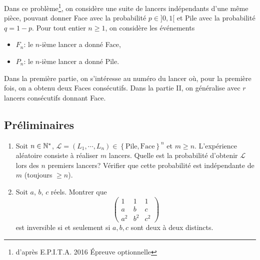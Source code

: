 Dans ce problème\footnote{d'après E.P.I.T.A. 2016 \'Epreuve optionnelle}, on considère une suite de lancers indépendants d'une même pièce, pouvant donner Face avec la probabilité $p \in ] 0, 1 [$ et Pile avec la probabilité $q = 1 - p$.\newline
Pour tout entier $n \geq 1$, on considère les événements
\begin{itemize}
 \item $F_n$: le $n$-ième lancer a donné Face,
 \item $P_n$: le $n$-ième lancer a donné Pile.
\end{itemize}
Dans la première partie, on s'intéresse au numéro du lancer où, pour la première fois, on a obtenu deux Faces consécutifs. Dans la partie II, on généralise avec $r$ lancers consécutifs donnant Face.

\subsection*{Préliminaires}
\begin{enumerate}
 \item Soit $n\in \mathbb{N}^*$, $\mathcal{L} = (L_1, \cdots, L_n) \in \left\lbrace \text{Pile} ,\text{Face} \right\rbrace ^n$ et $m\geq n$. L'expérience aléatoire consiste à réaliser $m$ lancers. Quelle est la probabilité d'obtenir $\mathcal{L}$ lors des $n$ premiers lancers? Vérifier que cette probabilité est indépendante de $m$ (toujours  $\geq n$).
 \item Soit $a$, $b$, $c$ réels. Montrer que  
\begin{displaymath}
\begin{pmatrix}
 1 & 1 & 1 \\ a & b & c \\ a^2 & b^2 & c^2
\end{pmatrix}
\end{displaymath}
est inversible si et seulement si $a, b,c$ sont deux à deux distincts.
\end{enumerate}
\clearpage

